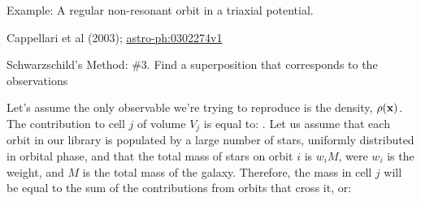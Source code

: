 \documentclass[letterpaper,landscape]{slides}
\begin{document}
\begin{slide}
\begin{center}
{\large \color{red} 
                  Example: A regular non-resonant orbit in a triaxial potential. }
\end{center}

\begin{center}
\vskip 0.5in
\vskip 0.5in
\end{center}

\begin{flushright}
Cappellari et al (2003); \href{https://arxiv.org/pdf/astro-ph/0302274v1.pdf}{astro-ph:0302274v1}
\end{flushright}

\vfill
\end{slide}

\begin{slide}
\begin{center}
{\large \color{red} 
                  Schwarzschild's Method: \#3. Find a superposition that
corresponds to the observations  }
\end{center}

Let's assume the only observable we're trying to reproduce is the density,
$\rho({\bf x})$. The contribution to cell $j$ of volume $V_j$ is equal to:
.
Let us assume that each orbit in our library is populated by a large number
of stars, uniformly distributed in orbital phase, and that the total mass of
stars on orbit $i$ is $w_i M$, were $w_i$ is the weight, and $M$ is the
total mass of the galaxy. Therefore, the mass in cell $j$ will be equal to
the sum of the contributions from orbits that cross it, or:

\vfill
\end{slide}
\end{document}
